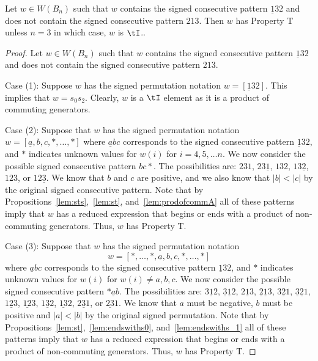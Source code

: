 \begin{proposition}\label{lem:132}
Let $w \in W(B_n)$ such that $w$ contains the signed consecutive pattern $\underline{1}32$ and does not contain the signed consecutive pattern $213$. Then $w$ has Property T unless $n=3$ in which case, $w$ is $\tI$..
\begin{proof}
	Let $w \in W(B_n)$ such that $w$ contains the signed consecutive pattern $\underline{1}32$ and does not contain the signed consecutive pattern $213$.
	
	Case (1): Suppose $w$ has the signed permutation notation $w=[\underline{1}32]$. This implies that $w=s_0s_2$. Clearly, $w$ is a $\tI$ element as it is a product of commuting generators.
	
	Case (2): Suppose that $w$ has the signed permutation notation $w=[\underline{a},b,c, \ast, \ldots, \ast]$ where $\underline{a}bc$ corresponds to the signed consecutive pattern $\underline{1}32$, and $\ast$ indicates unknown values for $w(i)$ for $i=4,5, \ldots n$. We now consider the possible signed consecutive pattern $bc \ast$. The possibilities are: $231$, $23 \underline{1}$, $13 2$, $13 \underline{2}$, $123$, or $12\underline{3}$. We know that $b$ and $c$ are positive, and we also know that $|b|<|c|$ by the original signed consecutive pattern. Note that by Propositions~\ref{lem:sts},~\ref{lem:st}, and~\ref{lem:prodofcommA} all of these patterns imply that $w$ has a reduced expression that begins or ends with a product of non-commuting generators. Thus, $w$ has Property T.
	
	Case (3): Suppose that $w$ has the signed permutation notation 
	\[w=[\ast, \ldots, \ast, \underline{a},b,c, \ast, \ldots, \ast]\] where $\underline{a}bc$ corresponds to the signed consecutive pattern $\underline{1}32$, and $\ast$ indicates unknown values for $w(i)$ for $w(i)\neq a,b,c$. We now consider the possible signed consecutive pattern $\ast \underline{a} b$. The possibilities are: $3 \underline{1} 2$, $\underline{3} \underline{1} 2$, $2 \underline{1} 3$, $\underline{2} \underline{1} 3$, $3 \underline{2} 1$, $\underline{3} \underline{2} 1$, $1 \underline{2} 3$, $\underline{12}3$, $1\underline{3}2$, $\underline{13}2$, $2\underline{3}1$, or $\underline{23}1$. We know that $a$ must be negative, $b$ must be positive and $|a|<|b|$ by the original signed permutation. Note that by Propositions~\ref{lem:st},~\ref{lem:endswiths0}, and~\ref{lem:endswiths_1} all of these patterns imply that $w$ has a reduced expression that begins or ends with a product of non-commuting generators. Thus, $w$ has Property T. 
%	
\end{proof}	
\end{proposition}

